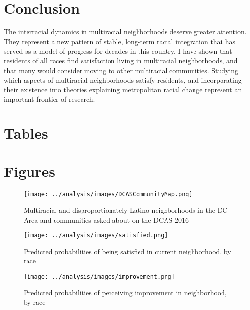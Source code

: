 \documentclass{baderart}
\begin{document}
\section{Conclusion}
The interracial dynamics in multiracial neighborhoods deserve greater attention. They represent a new pattern of stable, long-term racial integration that has served as a model of progress for decades in this country. I have shown that residents of all races find satisfaction living in multiracial neighborhoods, and that many would consider moving to other multiracial communities. Studying which aspects of multiracial neighborhoods satisfy residents, and incorporating their existence into theories explaining metropolitan racial change represent an important frontier of research.  


\clearpage
\singlespace
\singlespace
 	
	


\clearpage 

\section{Tables}



















\clearpage
\section{Figures}

\begin{figure}[h!]
\caption{Multiracial and disproportionately Latino neighborhoods in the DC Area and communities asked about on the DCAS 2016}
\label{fig:map}
\centering
\texttt{[image: ../analysis/images/DCASCommunityMap.png]}
\end{figure}

\begin{sidewaysfigure}
\caption{Predicted probabilities of being satisfied in current neighborhood, by race}
\label{fig:satisfaction}
\centering
\texttt{[image: ../analysis/images/satisfied.png]}
\end{sidewaysfigure}

\begin{sidewaysfigure}
\caption{Predicted probabilities of perceiving improvement in neighborhood, by race}
\label{fig:improvement}
\centering
\texttt{[image: ../analysis/images/improvement.png]}
\end{sidewaysfigure}
\end{document}
